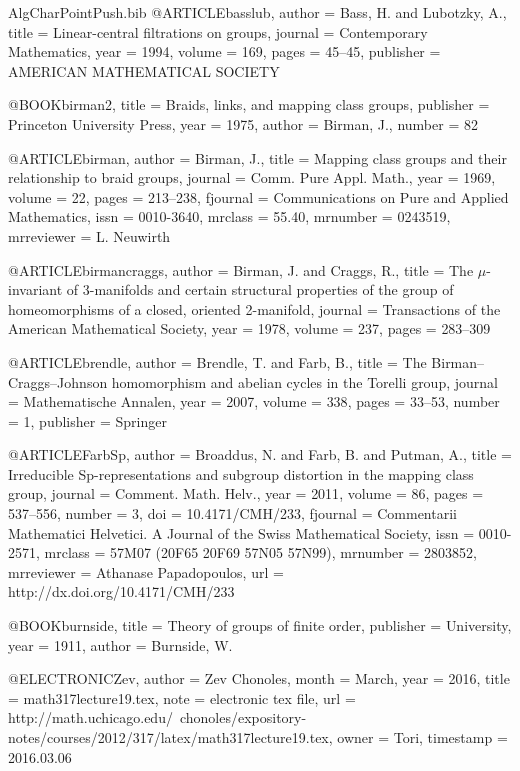 \documentclass[a4paper]{amsproc}
\theoremstyle{TheoremNum}
\theoremstyle{Theorembold}
\theoremstyle{TheoremboldDef}
\theoremstyle{TheoremboldRem}
\theoremstyle{TheoremboldRem}
\begin{document}
\begin{filecontents}{AlgCharPointPush.bib}
@ARTICLE{basslub,
  author = {Bass, H. and Lubotzky, A.},
  title = {Linear-central filtrations on groups},
  journal = {Contemporary Mathematics},
  year = {1994},
  volume = {169},
  pages = {45--45},
  publisher = {AMERICAN MATHEMATICAL SOCIETY}
}

@BOOK{birman2,
  title = {Braids, links, and mapping class groups},
  publisher = {Princeton University Press},
  year = {1975},
  author = {Birman, J.},
  number = {82}
}

@ARTICLE{birman,
  author = {Birman, J.},
  title = {Mapping class groups and their relationship to braid groups},
  journal = {Comm. Pure Appl. Math.},
  year = {1969},
  volume = {22},
  pages = {213--238},
  fjournal = {Communications on Pure and Applied Mathematics},
  issn = {0010-3640},
  mrclass = {55.40},
  mrnumber = {0243519},
  mrreviewer = {L. Neuwirth}
}

@ARTICLE{birmancraggs,
  author = {Birman, J. and Craggs, R.},
  title = {The $\mu$-invariant of 3-manifolds and certain structural properties
	of the group of homeomorphisms of a closed, oriented 2-manifold},
  journal = {Transactions of the American Mathematical Society},
  year = {1978},
  volume = {237},
  pages = {283--309}
}

@ARTICLE{brendle,
  author = {Brendle, T. and Farb, B.},
  title = {The Birman--Craggs--Johnson homomorphism and abelian cycles in the
	Torelli group},
  journal = {Mathematische Annalen},
  year = {2007},
  volume = {338},
  pages = {33--53},
  number = {1},
  publisher = {Springer}
}

@ARTICLE{FarbSp,
  author = {Broaddus, N. and Farb, B. and Putman, A.},
  title = {Irreducible {S}p-representations and subgroup distortion in the mapping
	class group},
  journal = {Comment. Math. Helv.},
  year = {2011},
  volume = {86},
  pages = {537--556},
  number = {3},
  doi = {10.4171/CMH/233},
  fjournal = {Commentarii Mathematici Helvetici. A Journal of the Swiss Mathematical
	Society},
  issn = {0010-2571},
  mrclass = {57M07 (20F65 20F69 57N05 57N99)},
  mrnumber = {2803852},
  mrreviewer = {Athanase Papadopoulos},
  url = {http://dx.doi.org/10.4171/CMH/233}
}

@BOOK{burnside,
  title = {Theory of groups of finite order},
  publisher = {University},
  year = {1911},
  author = {Burnside, W.}
}

@ELECTRONIC{Zev,
  author = {Zev Chonoles},
  month = {March},
  year = {2016},
  title = {math317lecture19.tex},
  note = {electronic tex file},
  url = {http://math.uchicago.edu/~chonoles/expository-notes/courses/2012/317/latex/math317lecture19.tex},
  owner = {Tori},
  timestamp = {2016.03.06}
}


\end{filecontents}
\end{document}
